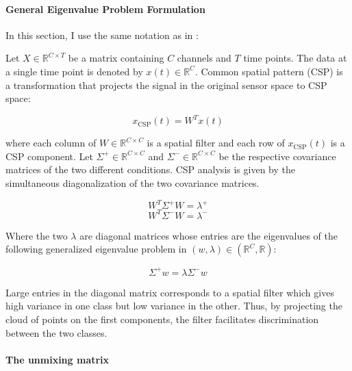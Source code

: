 \paragraph{General Eigenvalue Problem Formulation}

In this section, I use the same notation as in \cite{koles1991quantitative}:

Let $X \in \mathbb{R}^{C \times T}$ be a matrix containing $C$ channels and $T$ time points. The data at a single time point is denoted by $x(t) \in  \mathbb{R}^{C}$. Common spatial pattern (CSP) is a transformation that projects the signal in the original sensor space to CSP space:

\begin{equation}
    x_{\text{CSP}}(t) = W^{T}x(t)
\end{equation}

where each column of $W \in \mathbb{R}^{C  \times C}$ is a spatial filter and each row of $x_{\text{CSP}}(t)$ is a CSP component. Let $\Sigma^{+} \in \mathbb{R}^{C  \times C}$ and $\Sigma^{-} \in \mathbb{R}^{C  \times C}$ be the respective covariance matrices of the two different conditions. CSP analysis is given by the simultaneous diagonalization of the two covariance matrices.


\begin{equation}
    W^{T} \Sigma^{+} W = \lambda^{+}
    \label{eq:lambda_plus}
\end{equation}
\begin{equation}
    W^{T} \Sigma^{-} W = \lambda^{-}
    \label{eq:lambda_minus}
\end{equation}

Where the two $\lambda$ are diagonal matrices whose entries are the eigenvalues of the following generalized eigenvalue problem in $(w, \lambda) \in (\mathbb{R}^{C}, \mathbb{R})$:

\begin{equation}
    \Sigma^{+} w = \lambda \Sigma^{-} w
    \label{eq:general_eigenvalue}
\end{equation}

Large entries in the diagonal matrix corresponds to a spatial filter which gives high variance in one class but low variance in the other. Thus, by projecting the cloud of points on the first components, the filter facilitates discrimination between the two classes.

\paragraph{The unmixing matrix}

